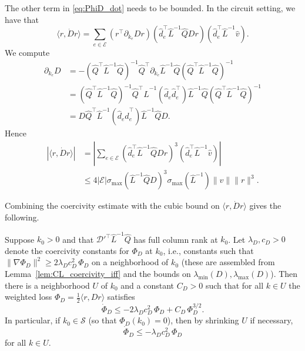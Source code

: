 \documentclass{siamart}
\begin{document}
The other term in \eqref{eq:PhiD_dot} needs to be bounded. In the circuit setting, we have that
\begin{equation*}
  \langle r, \dot{D}r\rangle = \sum_{e \in \mathcal{E}}\left(r^\top \partial_{k_e}Dr\right)\left(\hat{d}_e^\top \hat{L}^{-1}\hat{Q}Dr\right)\left(\hat{d}_e^\top \hat{L}^{-1}\hat{v}\right).
\end{equation*}
We compute
\[
\begin{aligned}\partial_{k_e}D &= -(\hat{Q}^\top \hat{L}^{-1}\hat{Q})^{-1} \hat{Q}^\top \partial_{k_e}\hat{L}^{-1}\hat{Q}(\hat{Q}^\top\hat{L}^{-1}\hat{Q})^{-1}
\\
&=(\hat{Q}^\top \hat{L}^{-1}\hat{Q})^{-1} \hat{Q}^\top \hat{L}^{-1}\left(\hat{d}_e\hat{d}_e^\top\right)\hat{L}^{-1}\hat{Q}(\hat{Q}^\top\hat{L}^{-1}\hat{Q})^{-1}
\\
&=D\hat{Q}^\top \hat{L}^{-1}\left(\hat{d}_e\hat{d}_e^\top\right)\hat{L}^{-1}\hat{Q}D.
\end{aligned}
\]
Hence
\begin{equation}
\begin{aligned}
 \left| \langle r, \dot{D}r\rangle \right|&= \left|\sum_{e \in \mathcal{E}}\left(\hat{d}_e^\top \hat{L}^{-1}\hat{Q}Dr\right)^3\left(\hat{d}_e^\top \hat{L}^{-1}\hat{v}\right)\right|
  \\& \leq 4|\mathcal{E}|\sigma_{\max}(\hat{L}^{-1}\hat{Q}D)^3\sigma_{\max}(\hat{L}^{-1})\|v\|\|r\|^3.
\end{aligned}
\end{equation}

Combining the coercivity estimate with the cubic bound on $\langle r, \dot{D}r\rangle$ gives the following.

\begin{theorem}[Coercivity of CL]
\label{thm:CL_coercivity}
    Suppose $k_0>0$ and that $\mathscr{D}'^\top\hat{L}^{-1}\hat{Q}$ has full column rank at $k_0$. Let $\lambda_D, c_D > 0$ denote the coercivity constants for $\Phi_D$ at $k_0$, i.e., constants such that $\|\nabla\Phi_D\|^2 \ge 2\lambda_D c_D^2\,\Phi_D$ on a neighborhood of $k_0$ (these are assembled from Lemma~\ref{lem:CL_coercivity_iff} and the bounds on $\lambda_{\min}(D), \lambda_{\max}(D)$). Then there is a neighborhood $U$ of $k_0$ and a constant $C_D > 0$ such that for all $k \in U$ the weighted loss $\Phi_D = \frac{1}{2}\langle r, Dr\rangle$ satisfies
\begin{equation}
    \dot{\Phi}_D  \leq -2\lambda_D c_D^2\,\Phi_D + C_D\,\Phi_D^{3/2}.
\end{equation}
In particular, if $k_0 \in \mathcal{S}$ (so that $\Phi_D(k_0) = 0$), then by shrinking $U$ if necessary,
\begin{equation}
    \dot{\Phi}_D \leq -\lambda_D c_D^2\,\Phi_D
\end{equation}
for all $k \in U$.
\end{theorem}
\end{document}
